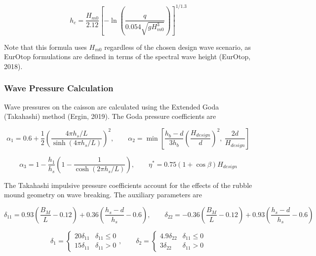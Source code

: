 \documentclass[a4paper, 11pt]{article}
\begin{document}
\begin{equation}
    h_c = \frac{H_{m0}}{2.12} \left[ -\ln\left( \frac{q}{0.054\sqrt{gH_{m0}^3}} \right) \right]^{1/1.3}
\end{equation}

Note that this formula uses $H_{m0}$ regardless of the chosen design wave scenario, as EurOtop formulations are defined in terms of the spectral wave height (EurOtop, 2018).

\subsubsection{Wave Pressure Calculation}

\hspace*{0.5cm} Wave pressures on the caisson are calculated using the Extended Goda (Takahashi) method (Ergin, 2019). The Goda pressure coefficients are

\begin{equation}
    \alpha_1 = 0.6 + \frac{1}{2}\left(\frac{4\pi h_s/L}{\sinh(4\pi h_s/L)}\right)^2, \qquad \alpha_2 = \min\left[\frac{h_b - d}{3h_b}\left(\frac{H_{design}}{d}\right)^2,\ \frac{2d}{H_{design}}\right]
\end{equation}

\begin{equation}
    \alpha_3 = 1 - \frac{h_1}{h_s}\left(1 - \frac{1}{\cosh(2\pi h_s/L)}\right), \qquad \eta^* = 0.75(1+\cos\beta)H_{design}
\end{equation}

The Takahashi impulsive pressure coefficients account for the effects of the rubble mound geometry on wave breaking. The auxiliary parameters are

\begin{equation}
    \delta_{11} = 0.93\left(\frac{B_M}{L} - 0.12\right) + 0.36\left(\frac{h_s-d}{h_s} - 0.6\right), \qquad \delta_{22} = -0.36\left(\frac{B_M}{L} - 0.12\right) + 0.93\left(\frac{h_s-d}{h_s} - 0.6\right)
\end{equation}

\begin{equation}
    \delta_1 = \begin{cases} 20\delta_{11} & \delta_{11} \leq 0 \\ 15\delta_{11} & \delta_{11} > 0 \end{cases}, \qquad \delta_2 = \begin{cases} 4.9\delta_{22} & \delta_{11} \leq 0 \\ 3\delta_{22} & \delta_{11} > 0 \end{cases}
\end{equation}
\end{document}
